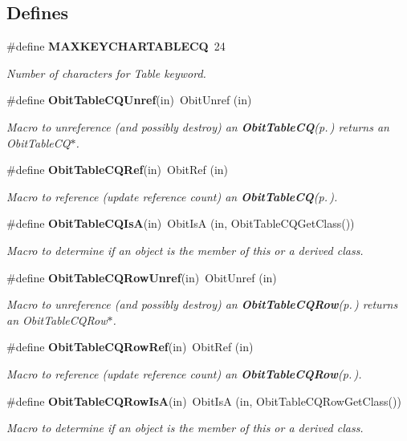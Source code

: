 \subsection*{Defines}
\begin{CompactItemize}
\item 
\#define {\bf MAXKEYCHARTABLECQ}\ 24
\begin{CompactList}\small\item\em Number of characters for Table keyword. \item\end{CompactList}\item 
\#define {\bf Obit\-Table\-CQUnref}(in)\ Obit\-Unref (in)
\begin{CompactList}\small\item\em Macro to unreference (and possibly destroy) an {\bf Obit\-Table\-CQ}{\rm (p.\,\pageref{structObitTableCQ})} returns an Obit\-Table\-CQ$\ast$. \item\end{CompactList}\item 
\#define {\bf Obit\-Table\-CQRef}(in)\ Obit\-Ref (in)
\begin{CompactList}\small\item\em Macro to reference (update reference count) an {\bf Obit\-Table\-CQ}{\rm (p.\,\pageref{structObitTableCQ})}. \item\end{CompactList}\item 
\#define {\bf Obit\-Table\-CQIs\-A}(in)\ Obit\-Is\-A (in, Obit\-Table\-CQGet\-Class())
\begin{CompactList}\small\item\em Macro to determine if an object is the member of this or a derived class. \item\end{CompactList}\item 
\#define {\bf Obit\-Table\-CQRow\-Unref}(in)\ Obit\-Unref (in)
\begin{CompactList}\small\item\em Macro to unreference (and possibly destroy) an {\bf Obit\-Table\-CQRow}{\rm (p.\,\pageref{structObitTableCQRow})} returns an Obit\-Table\-CQRow$\ast$. \item\end{CompactList}\item 
\#define {\bf Obit\-Table\-CQRow\-Ref}(in)\ Obit\-Ref (in)
\begin{CompactList}\small\item\em Macro to reference (update reference count) an {\bf Obit\-Table\-CQRow}{\rm (p.\,\pageref{structObitTableCQRow})}. \item\end{CompactList}\item 
\#define {\bf Obit\-Table\-CQRow\-Is\-A}(in)\ Obit\-Is\-A (in, Obit\-Table\-CQRow\-Get\-Class())
\begin{CompactList}\small\item\em Macro to determine if an object is the member of this or a derived class. \item\end{CompactList}\end{CompactItemize}
